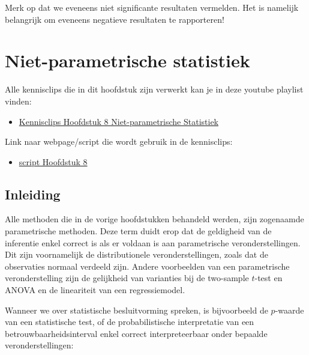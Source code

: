 \documentclass[
  12pt,dutch]{book}
\providecommand{\tightlist}{%
  \setlength{\itemsep}{0pt}\setlength{\parskip}{0pt}}
\theoremstyle{definition}
\theoremstyle{definition}
\theoremstyle{definition}
\theoremstyle{definition}
\theoremstyle{remark}
\begin{document}
Merk op dat we eveneens niet significante resultaten vermelden. Het is namelijk belangrijk om eveneens negatieve resultaten te rapporteren!

\chapter{Niet-parametrische statistiek}\label{niet-parametrische-statistiek}

Alle kennisclips die in dit hoofdstuk zijn verwerkt kan je in deze youtube playlist vinden:

\begin{itemize}
\tightlist
\item
  \href{https://www.youtube.com/playlist?list=PLZH1hP8_LbJJyR4mqLOxDwwOzysbhaFm1}{Kennisclips Hoofdstuk 8 Niet-parametrische Statistiek}
\end{itemize}

Link naar webpage/script die wordt gebruik in de kennisclips:

\begin{itemize}
\tightlist
\item
  \href{https://statomics.github.io/sbc/rmd/08-NonparametericStatistics.html}{script Hoofdstuk 8}
\end{itemize}

\section{Inleiding}\label{inleiding-7}

Alle methoden die in de vorige hoofdstukken behandeld werden, zijn zogenaamde parametrische methoden. Deze term duidt erop dat de geldigheid van de inferentie enkel correct is als er voldaan is aan parametrische veronderstellingen.
Dit zijn voornamelijk de distributionele veronderstellingen, zoals dat de observaties normaal verdeeld zijn. Andere
voorbeelden van een parametrische veronderstelling zijn de gelijkheid van varianties bij de two-sample \(t\)-test en ANOVA en de lineariteit van een regressiemodel.

Wanneer we over statistische besluitvorming spreken, is bijvoorbeeld de \(p\)-waarde van een statistische test, of de probabilistische interpretatie van een betrouwbaarheidsinterval enkel correct interpreteerbaar onder bepaalde veronderstellingen:
\end{document}
